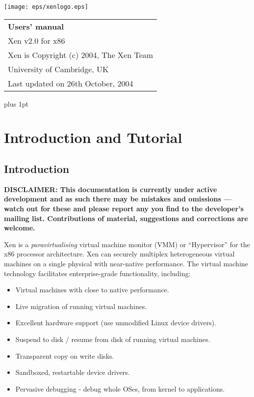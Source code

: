 \documentclass[11pt,twoside,final,openright]{xenstyle}
\begin{document}
\pagestyle{empty}
\begin{center}
\vspace*{\fill}
\texttt{[image: eps/xenlogo.eps]}
\vfill
\vfill
\vfill
\begin{tabular}{l}
{\Huge \bf Users' manual} \\[4mm]
{\huge Xen v2.0 for x86} \\[80mm]

{\Large Xen is Copyright (c) 2004, The Xen Team} \\[3mm]
{\Large University of Cambridge, UK} \\[20mm]
{\large Last updated on 26th October, 2004}
\end{tabular}
\vfill
\end{center}
\cleardoublepage

\pagestyle{plain}
{ \parskip 0pt plus 1pt
  \tableofcontents }
\cleardoublepage

\raggedbottom
{}
\parindent=0pt
\renewcommand{\topfraction}{.8}
\renewcommand{\bottomfraction}{.8}
\renewcommand{\textfraction}{.2}
\renewcommand{\floatpagefraction}{.8}

\newcommand{\path}[1]{{\tt #1}}

\part{Introduction and Tutorial}
\chapter{Introduction}

{\bf
DISCLAIMER: This documentation is currently under active development
and as such there may be mistakes and omissions --- watch out for
these and please report any you find to the developer's mailing list.
Contributions of material, suggestions and corrections are welcome.
}

Xen is a { \em paravirtualising } virtual machine monitor (VMM) or
``Hypervisor'' for the x86 processor architecture.  Xen can securely
multiplex heterogeneous virtual machines on a single physical with
near-native performance.  The virtual machine technology facilitates
enterprise-grade functionality, including:

\begin{itemize}
\item Virtual machines with close to native performance.
\item Live migration of running virtual machines.
\item Excellent hardware support (use unmodified Linux device drivers).
\item Suspend to disk / resume from disk of running virtual machines.
\item Transparent copy on write disks.
\item Sandboxed, restartable device drivers.
\item Pervasive debugging - debug whole OSes, from kernel to applications.
\end{itemize}
\end{document}

